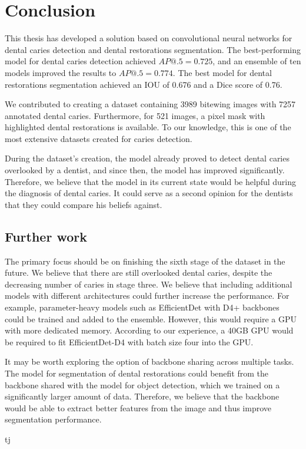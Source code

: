 \chapter{Conclusion}
\label{chapter:conclusion}

This thesis has developed a solution based on convolutional neural networks for dental caries detection and dental restorations segmentation. The best-performing model for dental caries detection achieved $AP@.5=0.725$, and an ensemble of ten models improved the results to $AP@.5=0.774$. The best model for dental restorations segmentation achieved an IOU of 0.676 and a Dice score of 0.76.

\medskip
We contributed to creating a dataset containing 3989 bitewing images with 7257 annotated dental caries. Furthermore, for 521 images, a pixel mask with highlighted dental restorations is available. To our knowledge, this is one of the most extensive datasets created for caries detection.

\medskip
During the dataset's creation, the model already proved to detect dental caries overlooked by a dentist, and since then, the model has improved significantly. Therefore, we believe that the model in its current state would be helpful during the diagnosis of dental caries. It could serve as a second opinion for the dentists that they could compare his beliefs against.

\section*{Further work}
The primary focus should be on finishing the sixth stage of the dataset in the future. We believe that there are still overlooked dental caries, despite the decreasing number of caries in stage three.
\medskip
We believe that including additional models with different architectures could further increase the performance. For example, parameter-heavy models such as EfficientDet with D4+ backbones could be trained and added to the ensemble. However, this would require a GPU with more dedicated memory. According to our experience, a 40GB GPU would be required to fit EfficientDet-D4 with batch size four into the GPU.

\medskip
It may be worth exploring the option of backbone sharing across multiple tasks. The model for segmentation of dental restorations could benefit from the backbone shared with the model for object detection, which we trained on a significantly larger amount of data. Therefore, we believe that the backbone would be able to extract better features from the image and thus improve segmentation performance.



tj